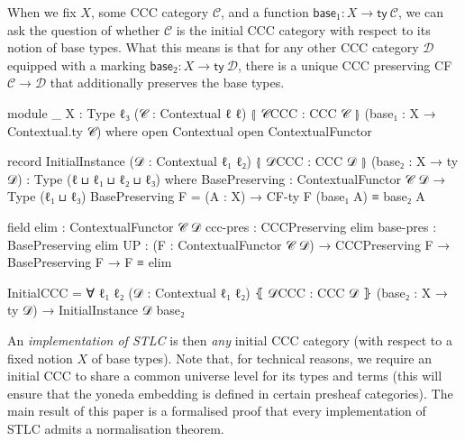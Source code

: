 When we fix $X$, some CCC category $\mathcal{C}$, and a function $\mathsf{base}
_\mathit{1} : X → \mathsf{ty}~\mathcal{C}$, we can ask the question of whether
$\mathcal{C}$ is the initial CCC category with respect to its notion of base
types. What this means is that for any other CCC category $\mathcal{D}$ equipped
with a marking $\mathsf{base}_\mathit{2} : X → \mathsf{ty}~\mathcal{D}$, there
is a unique CCC preserving CF $\mathcal{C} \to \mathcal{D}$ that additionally
preserves the base types.
\begin{code}
module _ {X : Type ℓ₃} (𝒞 : Contextual ℓ ℓ) ⦃ 𝒞CCC : CCC 𝒞 ⦄
         (base₁ : X → Contextual.ty 𝒞) where
  open Contextual
  open ContextualFunctor

  record InitialInstance (𝒟 : Contextual ℓ₁ ℓ₂) ⦃ 𝒟CCC : CCC 𝒟 ⦄
                         (base₂ : X → ty 𝒟) : Type (ℓ ⊔ ℓ₁ ⊔ ℓ₂ ⊔ ℓ₃) where
    BasePreserving : ContextualFunctor 𝒞 𝒟 → Type (ℓ₁ ⊔ ℓ₃)
    BasePreserving F = (A : X) → CF-ty F (base₁ A) ≡ base₂ A

    field
      elim : ContextualFunctor 𝒞 𝒟
      ccc-pres : CCCPreserving elim
      base-pres : BasePreserving elim
      UP : (F : ContextualFunctor 𝒞 𝒟) → CCCPreserving F → BasePreserving F →
        F ≡ elim

  InitialCCC = ∀ {ℓ₁} {ℓ₂} (𝒟 : Contextual ℓ₁ ℓ₂) ⦃ 𝒟CCC : CCC 𝒟 ⦄
    (base₂ : X → ty 𝒟) → InitialInstance 𝒟 base₂
\end{code}
An \emph{implementation of STLC} is then \emph{any} initial CCC category (with
respect to a fixed notion $X$ of base types). Note that, for technical reasons,
we require an initial CCC to share a common universe level for its types and
terms (this will ensure that the yoneda embedding is defined in certain presheaf
categories). The main result of this paper is a formalised proof that every
implementation of STLC admits a normalisation theorem.


